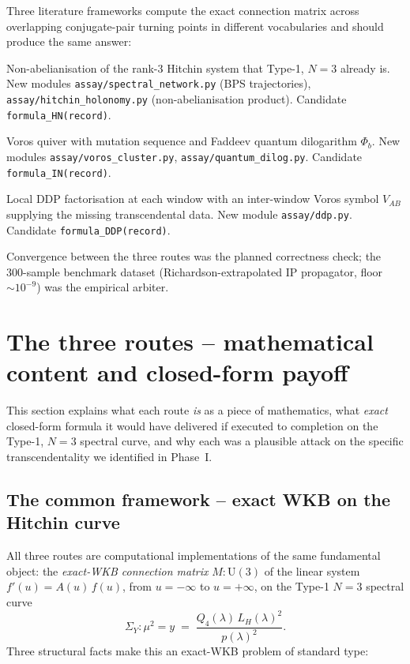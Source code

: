 \documentclass[11pt]{article}
\begin{document}
Three literature frameworks compute the exact connection matrix across
overlapping conjugate-pair turning points in different vocabularies and
should produce the same answer:

\begin{description}[leftmargin=2em]
 \item[Route A -- Hollands--Neitzke spectral networks.] Non-abelianisation
 of the rank-3 Hitchin system that Type-1, $N=3$ already is. New modules
 \texttt{assay/spectral\_network.py} (BPS trajectories), \texttt{assay/hitchin\_holonomy.py}
 (non-abelianisation product). Candidate \texttt{formula\_HN(record)}.
 \item[Route B -- Iwaki--Nakanishi cluster algebras.] Voros quiver with
 mutation sequence and Faddeev quantum dilogarithm $\Phi_b$. New modules
 \texttt{assay/voros\_cluster.py}, \texttt{assay/quantum\_dilog.py}.
 Candidate \texttt{formula\_IN(record)}.
 \item[Route C -- Aoki--Kawai--Takei DDP.] Local DDP factorisation at each
 window with an inter-window Voros symbol $V_{AB}$ supplying the missing
 transcendental data. New module \texttt{assay/ddp.py}.
 Candidate \texttt{formula\_DDP(record)}.
\end{description}

Convergence between the three routes was the planned correctness check;
the 300-sample benchmark dataset (Richardson-extrapolated IP propagator,
floor $\sim10^{-9}$) was the empirical arbiter.

\section{The three routes -- mathematical content and closed-form payoff}
\label{sec:routes}

This section explains what each route \emph{is} as a piece of mathematics,
what \emph{exact} closed-form formula it would have delivered if executed
to completion on the Type-1, $N=3$ spectral curve, and why each was a
plausible attack on the specific transcendentality we identified in
Phase~I.

\subsection{The common framework -- exact WKB on the Hitchin curve}
\label{sec:routes-common}

All three routes are computational implementations of the same
fundamental object: the \emph{exact-WKB connection matrix}
$M:\mathrm U(3)$ of the linear system $f'(u) = A(u)\,f(u)$, from $u=-\infty$
to $u=+\infty$, on the Type-1 $N=3$ spectral curve
\[
\Sigma_Y : \mu^2 = y \;=\; \frac{Q_4(\lambda)\, L_H(\lambda)^2}{p(\lambda)^2}.
\]
Three structural facts make this an exact-WKB problem of standard type:
\end{document}
